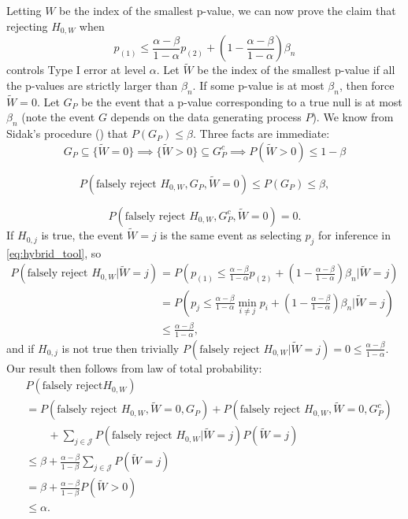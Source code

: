 \documentclass{article}
\begin{document}
\begin{appendix}
Letting $W$ be the index of the smallest p-value, we can now prove the claim that rejecting $H_{0, W}$ when 
\begin{equation*}
    p_{(1)} \leq \frac{\alpha-\beta}{1-\alpha} p_{(2)} + \left(1 - \frac{\alpha-\beta}{1-\alpha} \right) \beta_n 
\end{equation*}
controls Type I error at level $\alpha$. Let $\widetilde{W}$ be the index of the smallest p-value if all the p-values are strictly larger than $\beta_n$. If some p-value is at most $\beta_n$, then force $\widetilde{W}=0$. Let $G_P$ be the event that a p-value corresponding to a true null is at most $\beta_n$ (note the event $G$ depends on the data generating process $P$). We know from Sidak's procedure () that $P(G_P) \leq \beta$. Three facts are immediate: 
\begin{equation*}
    G_P \subseteq \{\widetilde{W} = 0 \} \implies \{\widetilde{W} > 0 \} \subseteq G_P^c \implies P(\widetilde{W} > 0) \leq 1-\beta 
\end{equation*}

\begin{equation*}
    P(\text{falsely reject } H_{0, W}, G_P, \widetilde{W} = 0) \leq P(G_P) \leq \beta,
\end{equation*}

\begin{equation*}
    P(\text{falsely reject } H_{0, W}, G^c_P, \widetilde{W} = 0) = 0. 
\end{equation*}
If $H_{0, j}$ is true, the event $\widetilde{W} = j$ is the same event as selecting $p_j$ for inference in \eqref{eq:hybrid_tool}, so 
\begin{align*}
    P(\text{falsely reject } H_{0, W} | \widetilde{W} = j) &= P\left(p_{(1)} \leq \frac{\alpha-\beta}{1-\alpha} p_{(2)} + \left(1 - \frac{\alpha-\beta}{1-\alpha} \right) \beta_n | \widetilde{W} = j\right)\\
    &=  P\left(p_j \leq \frac{\alpha-\beta}{1-\alpha} \min_{i \neq j}p_i + \left(1 - \frac{\alpha-\beta}{1-\alpha} \right) \beta_n | \widetilde{W} = j\right)\\
    &\leq \frac{\alpha - \beta}{1-\alpha},
\end{align*}
and if $H_{0, j}$ is not true then trivially $P(\text{falsely reject } H_{0, W} | \widetilde{W} = j) = 0 \leq \frac{\alpha - \beta}{1-\alpha}$. Our result then follows from law of total probability:
\begin{align*}
    &P(\text{falsely reject} H_{0, W} )\\
    &= P(\text{falsely reject } H_{0, W}, \widetilde{W} = 0, G_P) + P(\text{falsely reject } H_{0, W}, \widetilde{W} = 0, G_P^c) \\
    &\qquad + \sum_{j \in \mathcal{J}}P(\text{falsely reject } H_{0, W} | \widetilde{W} = j ) P(\widetilde{W} = j)\\
    &\leq \beta + \frac{\alpha - \beta}{1-\beta} \sum_{j \in \mathcal{J}} P(\widetilde{W} = j)\\
    &= \beta + \frac{\alpha - \beta}{1-\beta} P(\widetilde{W} > 0)\\
    &\leq \alpha. 
\end{align*}


\end{appendix}
\end{document}
